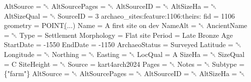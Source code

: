 \documentclass[
  letterpaper,
  DIV=11,
  numbers=noendperiod]{scrartcl}
\newenvironment{Shaded}{\begin{snugshade}}{\end{snugshade}}
\newcommand{\AttributeTok}[1]{\textcolor[rgb]{1.00,0.47,0.78}{#1}}
\newcommand{\ErrorTok}[1]{\textcolor[rgb]{1.00,0.33,0.33}{\underline{#1}}}
\newcommand{\ExtensionTok}[1]{\textcolor[rgb]{0.55,0.91,0.99}{#1}}
\newcommand{\KeywordTok}[1]{\textcolor[rgb]{1.00,0.47,0.78}{#1}}
\newcommand{\NormalTok}[1]{\textcolor[rgb]{0.97,0.97,0.95}{#1}}
\newcommand{\StringTok}[1]{\textcolor[rgb]{0.95,0.98,0.55}{#1}}
\begin{document}
\begin{tcolorbox}
\begin{Shaded}
\begin{Highlighting}[]
                               \ExtensionTok{AltSource}\NormalTok{ = ␀}
                          \ExtensionTok{AltSourcePages}\NormalTok{ = ␀}
                             \ExtensionTok{AltSourceID}\NormalTok{ = ␀}
                               \ExtensionTok{AltSizeHa}\NormalTok{ = ␀}
                             \ExtensionTok{AltSizeQual}\NormalTok{ = ␀}
                                \ExtensionTok{SourceID}\NormalTok{ = 3}
            \ExtensionTok{archaeo\_sites:feature:1106:theirs:}
                                     \ExtensionTok{fid}\NormalTok{ = 1106}
                                \ExtensionTok{geometry}\NormalTok{ = POINT}\ErrorTok{(}\ExtensionTok{...}\KeywordTok{)}
                                    \ExtensionTok{Name}\NormalTok{ = A first site on dev}
                                 \ExtensionTok{NameAlt}\NormalTok{ = ␀}
                             \ExtensionTok{AncientName}\NormalTok{ = ␀}
                                    \ExtensionTok{Type}\NormalTok{ = Settlement}
                              \ExtensionTok{Morphology}\NormalTok{ = Flat site}
                                  \ExtensionTok{Period}\NormalTok{ = Late Bronze Age}
                               \ExtensionTok{StartDate}\NormalTok{ = }\AttributeTok{{-}1550}
                                 \ExtensionTok{EndDate}\NormalTok{ = }\AttributeTok{{-}1150}
                           \ExtensionTok{ArchaeoStatus}\NormalTok{ = Surveyed}
                                \ExtensionTok{Latitude}\NormalTok{ = ␀}
                               \ExtensionTok{Longitude}\NormalTok{ = ␀}
                                \ExtensionTok{Northing}\NormalTok{ = ␀}
                                 \ExtensionTok{Easting}\NormalTok{ = ␀}
                                 \ExtensionTok{LocQual}\NormalTok{ = A}
                                  \ExtensionTok{SizeHa}\NormalTok{ = ␀}
                                \ExtensionTok{SizeQual}\NormalTok{ = C}
                              \ExtensionTok{SiteHeight}\NormalTok{ = ␀}
                                  \ExtensionTok{Source}\NormalTok{ = kart4arch2024}
                                   \ExtensionTok{Pages}\NormalTok{ = ␀}
                                   \ExtensionTok{Notes}\NormalTok{ = ␀}
                                 \ExtensionTok{Subtype}\NormalTok{ = \{}\StringTok{"farm"}\NormalTok{\}}
                               \ExtensionTok{AltSource}\NormalTok{ = ␀}
                          \ExtensionTok{AltSourcePages}\NormalTok{ = ␀}
                             \ExtensionTok{AltSourceID}\NormalTok{ = ␀}
                               \ExtensionTok{AltSizeHa}\NormalTok{ = ␀}

\end{Highlighting}
\end{Shaded}
\end{tcolorbox}
\end{document}
